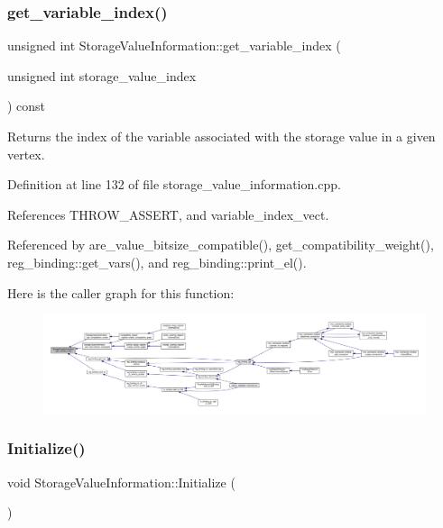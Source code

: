 \subsubsection{\texorpdfstring{get\+\_\+variable\+\_\+index()}{get\_variable\_index()}}
{\footnotesize\ttfamily unsigned int Storage\+Value\+Information\+::get\+\_\+variable\+\_\+index (\begin{DoxyParamCaption}\item[{unsigned int}]{storage\+\_\+value\+\_\+index }\end{DoxyParamCaption}) const}



Returns the index of the variable associated with the storage value in a given vertex. 



Definition at line 132 of file storage\+\_\+value\+\_\+information.\+cpp.



References T\+H\+R\+O\+W\+\_\+\+A\+S\+S\+E\+RT, and variable\+\_\+index\+\_\+vect.



Referenced by are\+\_\+value\+\_\+bitsize\+\_\+compatible(), get\+\_\+compatibility\+\_\+weight(), reg\+\_\+binding\+::get\+\_\+vars(), and reg\+\_\+binding\+::print\+\_\+el().

Here is the caller graph for this function\+:
\nopagebreak
\begin{figure}[H]
\begin{center}
\leavevmode
\includegraphics[width=350pt]{d8/dbe/classStorageValueInformation_aba9fe8ab9e8d87fc8b58d470b7c8f6f5_icgraph}
\end{center}
\end{figure}
\mbox{\label{classStorageValueInformation_af5c2b65a807420f83b1cf8d7a8516f5b}} 
\subsubsection{\texorpdfstring{Initialize()}{Initialize()}}
{\footnotesize\ttfamily void Storage\+Value\+Information\+::\+Initialize (\begin{DoxyParamCaption}{ }\end{DoxyParamCaption})}




